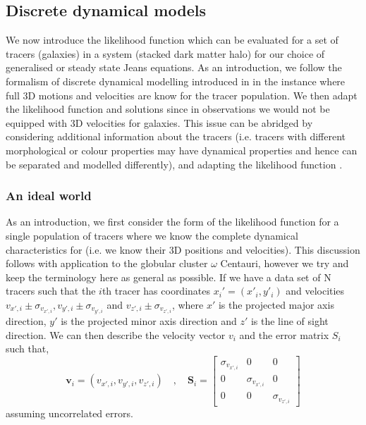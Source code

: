 \subsection{Discrete dynamical models} \label{sec:discrete_dynamical_models}
We now introduce the likelihood function which can be evaluated for a set of tracers (galaxies) in a system (stacked dark matter halo) for our choice of generalised or steady state Jeans equations. As an introduction, we follow the formalism of discrete dynamical modelling introduced in \citet{watkins2013} in the instance where full 3D motions and velocities are know for the tracer population. We then adapt the likelihood function and solutions since in observations we would not be equipped with 3D velocities for galaxies. This issue can be abridged by considering additional information about the tracers (i.e. tracers with different morphological or colour properties may have dynamical properties and hence can be separated and modelled differently), and adapting the likelihood function \citep[e.g.][]{zhu16sculptor}.


\subsubsection{An ideal world}
As an introduction, we first consider the form of the likelihood function for a single population of tracers where we know the complete dynamical characteristics for (i.e. we know their 3D positions and velocities). This discussion follows \citet{watkins2013} with application to the globular cluster $\omega$ Centauri, however we try and keep the terminology here as general as possible. If we have a data set of N tracers such that the $i$th tracer has coordinates $x_{i}'= (x'_{i},y'_{i})$ and velocities $v_{x',i} \pm \sigma_{v_{x',i}}, v_{y',i} \pm \sigma_{v_{y',i}}$ and $v_{z',i} \pm \sigma_{v_{z',i}}$, where $x'$ is the projected major axis direction, $y'$ is the projected minor axis direction and $z'$ is the line of sight direction. We can then describe the velocity vector \textbf{$v_{i}$} and the error matrix \textbf{$S_{i}$} such that,
\begin{equation}
\boldsymbol{v}_{i} = (v_{x',i},v_{y',i},v_{z',i}) \quad , \quad \boldsymbol{S}_{i} = \begin{bmatrix} \sigma_{v_{x',i}} & 0 & 0 \\ 0 & \sigma_{v_{x',i}} & 0 \\ 0 & 0 & \sigma_{v_{z',i}} \end{bmatrix}
\end{equation}
assuming uncorrelated errors.


